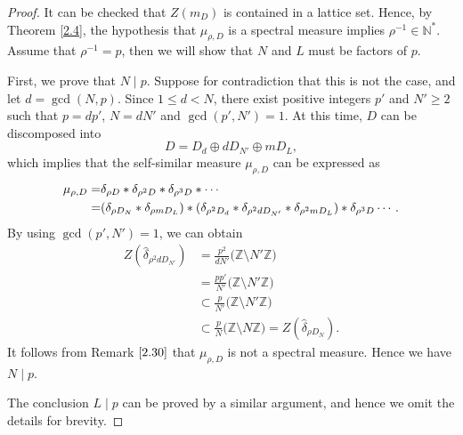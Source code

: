 \documentclass[11pt]{article}
\numberwithin{equation}{section}
\begin{document}
\begin{proof}
It can be checked that $Z(m_D)$ is contained in a lattice set. Hence, by Theorem \ref{2.4}, the hypothesis that $\mu_{\rho,D}$ is a spectral measure implies $\rho^{-1} \in \mathbb{N}^*$. Assume that $\rho^{-1}=p$, then we will show that $N$ and $L$ must be factors of $p$.


First, we prove that $N \mid p$. Suppose for contradiction that this is not the case, and let
$d=\gcd(N,p)$. Since $1\le d<N$, there exist positive integers $p'$ and $N'\geq 2$ such that $p = dp'$, $N = dN'$ and $\gcd(p',N')=1$.
At this time, $D$ can be discomposed into
$$D=D_d \oplus dD_{N'}\oplus mD_L,$$
which implies that the self-similar measure $\mu_{\rho,D}$ can be expressed as
\begin{align*}
\mu_{\rho,D}=&\delta_{\rho D} \ast \delta_{\rho^2 D} \ast \delta_{\rho^3 D} \ast \cdots  \notag  \\
=&(\delta_{\rho D_N}* \delta_{\rho mD_L})* ( \delta_{\rho^2 D_d}  \ast \delta_{\rho^2 d D_{N'}}\ast \delta_{\rho^2 mD_L}) \ast \delta_{\rho^3 D} \cdots.
\end{align*}
By using $\gcd(p',N')=1$, we can obtain
\begin{align*}
	Z(\hat{\delta}_{\rho^2 d D_{N'}})
	&= \frac{p^2}{dN'}\big(\mathbb{Z}\setminus N'\mathbb{Z}\big)  \\
	&= \frac{pp'}{N'}\big(\mathbb{Z}\setminus N'\mathbb{Z}\big)  \\
	&\subset \frac{p}{N'}\big(\mathbb{Z}\setminus N'\mathbb{Z}\big) \\
	&\subset \frac{p}{N}\big(\mathbb{Z}\setminus N\mathbb{Z}\big)
	= Z(\hat{\delta}_{\rho D_N}).
\end{align*}
It follows from Remark $\ref{2.30}$ that $\mu_{\rho,D}$ is not a spectral measure. Hence we have $N \mid p$.

The conclusion $L \mid p$ can be proved by a similar argument, and hence we omit the details for brevity.

\end{proof}
\end{document}
